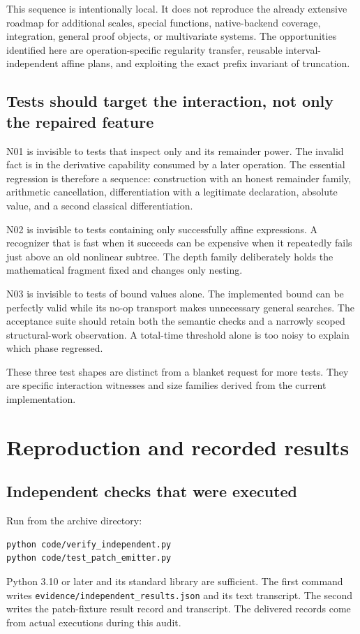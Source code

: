 \documentclass[11pt,a4paper]{article}
\newcommand{\code}[1]{\texttt{\detokenize{#1}}}
\newcommand{\file}[1]{\nolinkurl{#1}}
\begin{document}
This sequence is intentionally local. It does not reproduce the already extensive
roadmap for additional scales, special functions, native-backend coverage,
integration, general proof objects, or multivariate systems. The opportunities
identified here are operation-specific regularity transfer, reusable
interval-independent affine plans, and exploiting the exact prefix invariant
of truncation.

\subsection{Tests should target the interaction, not only the repaired feature}
N01 is invisible to tests that inspect only \code{Normal[result]} and its
remainder power. The invalid fact is in the derivative capability consumed by a
later operation. The essential regression is therefore a sequence:
construction with an honest remainder family, arithmetic cancellation,
differentiation with a legitimate declaration, absolute value, and a second
classical differentiation.

N02 is invisible to tests containing only successfully affine expressions.
A recognizer that is fast when it succeeds can be expensive when it repeatedly
fails just above an old nonlinear subtree. The depth family deliberately holds
the mathematical fragment fixed and changes only nesting.

N03 is invisible to tests of bound values alone. The implemented bound can be
perfectly valid while its no-op transport makes unnecessary general searches.
The acceptance suite should retain both the semantic checks and a narrowly
scoped structural-work observation. A total-time threshold alone is too noisy
to explain which phase regressed.

These three test shapes are distinct from a blanket request for more tests.
They are specific interaction witnesses and size families derived from the
current implementation.

\section{Reproduction and recorded results}
\subsection{Independent checks that were executed}
Run from the archive directory:
\begin{lstlisting}
python code/verify_independent.py
python code/test_patch_emitter.py
\end{lstlisting}
Python 3.10 or later and its standard library are sufficient. The first command
writes \file{evidence/independent_results.json} and its text transcript. The
second writes the patch-fixture result record and transcript. The delivered
records come from actual executions during this audit.
\end{document}
